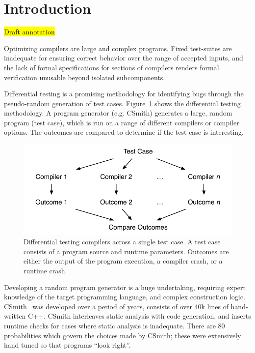 \section{Introduction}\label{sec:intro}

\hl{Draft annotation}

\noindent
Optimizing compilers are large and complex programs. Fixed test-suites are inadequate for ensuring correct behavior over the range of accepted inputs, and the lack of formal specifications for sections of compilers renders formal verification unusable beyond isolated subcomponents.

Differential testing is a promising methodology for identifying bugs through the pseudo-random generation of test cases. Figure~\ref{fig:difftest} shows the differential testing methodology. A program generator (e.g. CSmith) generates a large, random program (test case), which is run on a range of different compilers or compiler options. The outcomes are compared to determine if the test case is interesting.

\begin{figure}
	\centering
	\includegraphics[width=.9\columnwidth]{img/difftest} %
	\caption{%
		Differential testing compilers across a single test case. A test case consists of a program source and runtime parameters. Outcomes are either the output of the program execution, a compiler crash, or a runtime crash.%
	}%
	\label{fig:difftest}
\end{figure}

Developing a random program generator is a huge undertaking, requiring expert knowledge of the target programming language, and complex construction logic. CSmith~\cite{Yang2011} was developed over a period of years, consists of over 40k lines of hand-written C++. CSmith interleaves static analysis with code generation, and inserts runtime checks for cases where static analysis is inadequate. There are 80 probabilities which govern the choices made by CSmith; these were extensively hand tuned so that programs ``look right''.


